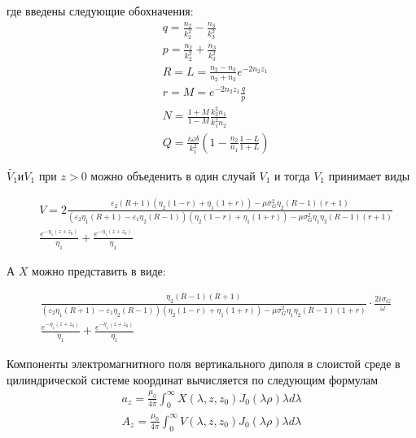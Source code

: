 	где введены следующие обохначения:
	\begin{equation}
		\begin{aligned}
			&q = \frac{n_2}{k_2^2} - \frac{n_3}{k_3^2} \\
			&p = \frac{n_2}{k_2^2} + \frac{n_3}{k_3^2} \\
			&R = L = \frac{n_2 - n_3}{n_2 + n_3} e^{-2n_2 z_1} \\
			&r = M = e^{-2 n_2 z_1}\frac{q}{p} \\
			&N = \frac{1 + M}{1 - M}\frac{k_2^2 n_1}{k_1^2 n_2} \\
			&Q = \frac{i \omega \delta}{k_1^2} (1 - \frac{n_2}{n_1}\frac{1 - L}{1 + L})
		\end{aligned}
	\end{equation}
	
	$\tilde{V_1} и V_1$ при $z > 0$ можно объеденить в один случай $V_1$ и тогда $V_1$ принимает виды
	
	\begin{equation}
		\begin{aligned}
			&V = 2 \frac{\varepsilon_2 (R + 1) (\eta_2 (1 - r) + \eta_1(1 + r)) - \mu \sigma_G^2 \eta_2 (R - 1) (r + 1)}{(\varepsilon_2 \eta_1 (R + 1) - \varepsilon_1 \eta_2 (R - 1))(\eta_2 (1 - r) + \eta_1(1 + r)) - \mu \sigma_G^2 \eta_1 \eta_2 (R - 1)(r + 1)} \\
			&\frac{e^{-\eta_1(z + z_0)}}{\eta_1} + \frac{e^{-\eta_1(z + z_0)}}{\eta_1}
		\end{aligned}
		
	\end{equation}
	
	А $X$ можно представить в виде:
	
	
	
	\begin{equation}
		\begin{aligned}
			&\frac{\eta_2(R - 1) (R + 1)}{(\varepsilon_2 \eta_1 (R + 1) - \varepsilon_1 \eta_2 (R - 1)) 
				(\eta_2 (1 - r) + \eta_1 (1 + r)) - \mu \sigma_G^2 \eta_1 \eta_2 (R - 1) (1  + r)} \cdot 
			\frac{2i \sigma_G}{\omega} \\
			& \frac{e^{-\eta_1(z + z_0)}}{\eta_1} + \frac{e^{-\eta_1(z + z_0)}}{\eta_1}
		\end{aligned}
		
	\end{equation}
	
	\newpage
	
	Компоненты электромагнитного поля вертикального диполя в слоистой среде
	в цилиндрической системе координат вычисляется по следующим формулам
	\begin{equation*}
		\begin{aligned}
			a_z = \frac{\mu_0 }{4 \pi} \int_0^{\infty} X(\lambda, z, z_0) J_0(\lambda \rho)\lambda d \lambda \\
			A_z = \frac{\mu_0 }{4 \pi} \int_0^{\infty} V(\lambda, z, z_0) J_0(\lambda \rho) \lambda d \lambda
		\end{aligned}
	\end{equation*}
	
